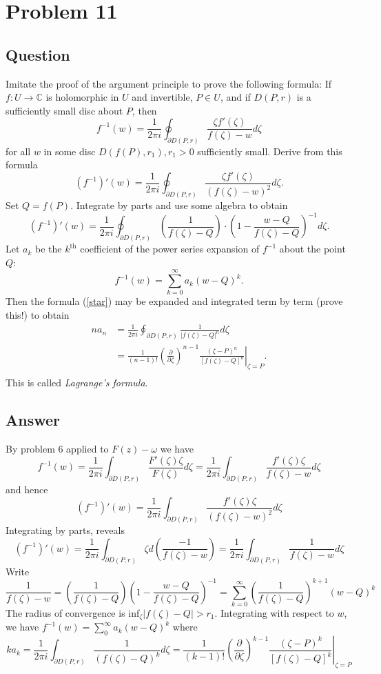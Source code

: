 \documentclass[11pt]{article}
\begin{document}
\section{Problem 11}
\subsection{Question}
Imitate the proof of the argument principle to prove the following formula: If $f: U \to \mathbb{C}$ is holomorphic in $U$ and invertible, $P \in U$, and if $D(P,r)$ is a sufficiently small disc about $P$, then
\[f^{-1}(w) = \frac{1}{2 \pi i} \oint_{\partial D(P,r)} \frac{\zeta f'(\zeta)}{f(\zeta) - w} d \zeta\]
for all $w$ in some disc $D(f(P),r_1),r_1 >0$ sufficiently small. Derive from this formula
\[(f^{-1})'(w) = \frac{1}{2 \pi i} \oint_{\partial D(P,r)} \frac{\zeta f'(\zeta)}{(f(\zeta) - w)^2} d \zeta.\]
Set $Q = f(P)$. Integrate by parts and use some algebra to obtain
\begin{equation} \label{star} (f^{-1})'(w) = \frac{1}{2 \pi i } \oint _{\partial D(P,r)} \left( \frac{1}{f(\zeta) - Q} \right) \cdot \left( 1 - \frac{w-Q}{f(\zeta) - Q} \right) ^{-1} d \zeta. \end{equation}
Let $a_k$ be the $k^\mathrm{th}$ coefficient of the power series expansion of $f^{-1}$ about the point $Q$:
\[f^{-1} (w) = \sum_{k=0}^ \infty a_k (w - Q)^k.\]
Then the formula (\ref{star}) may be expanded and integrated term by term (prove this!) to obtain
\begin{align*}
na_n & =  \frac{1}{2 \pi i} \oint_{\partial D(P,r)} \frac{1}{|f(\zeta) - Q|^n} d \zeta\\
& =  \frac{1 }{(n-1)!} \left( \frac{\partial}{\partial \zeta} \right) ^{n-1} \left. \frac{(\zeta - P)^n}{[f(\zeta) - Q]^n} \right|_{\zeta= P}. \\
\end{align*}
This is called \emph{Lagrange's formula}.
\subsection{Answer}
By problem 6 applied to $F(z) - \omega$ we have
\[f^{-1}(w) = \frac{1}{2 \pi i} \int_{\partial D(P,r)} \frac{F'(\zeta) \zeta }{F(\zeta)} d \zeta = \frac{1}{2 \pi i } \int_{\partial D(P,r)} \frac{f'(\zeta)\zeta}{f(\zeta) - w} d \zeta \]
and hence
\[ (f^{-1})'(w) = \frac{1}{2 \pi i } \int_{ \partial D (P,r)} \frac{f'(\zeta)\zeta}{(f(\zeta) -w)^2} d\zeta\]
Integrating by parts, reveals
\[(f^{-1})'(w) = \frac{1}{2 \pi i}  \int_{\partial D(P,r)} \zeta d\left( \frac{-1}{f(\zeta) -w} \right) = \frac{1}{2 \pi i} \int_{\partial D(P,r)} \frac{1}{f(\zeta) - w} d\zeta\]
Write
\[\frac{1}{f(\zeta) - w} = \left( \frac{1}{f(\zeta) - Q}\right) \left( 1 - \frac{w -Q}{f(\zeta) - Q} \right)^{-1} = \sum_{k=0}^\infty \left( \frac{1}{f(\zeta) - Q} \right)^{k+1} (w- Q)^k\]
The radius of convergence is inf$_\zeta |f(\zeta) - Q| > r_1$. Integrating with respect to $w$, we have $f^{-1}(w) = \sum_0^\infty a_k ( w - Q)^k$ where
\[ka_k = \frac{1}{2\pi i } \int_{\partial D(P,r)} \frac{1}{(f(\zeta) - Q)^k} d\zeta = \left. \frac{1}{(k-1)!} \left( \frac{\partial}{\partial \zeta} \right)^{k-1} \frac{(\zeta - P)^k }{[f(\zeta) - Q]^k} \right|_{\zeta = P}\]
\end{document}
